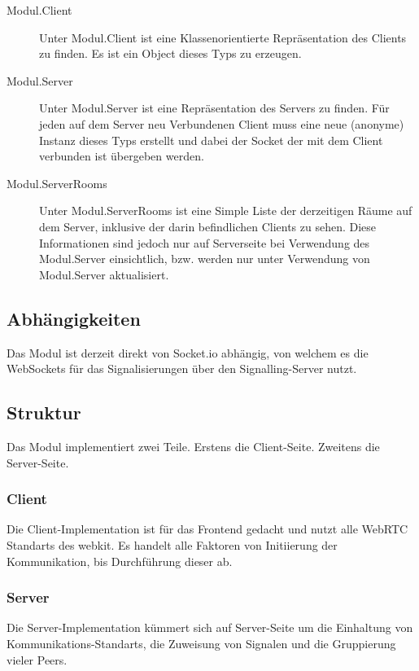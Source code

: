 \begin{description}
\item[Modul.Client]
Unter Modul.Client ist eine Klassenorientierte Repräsentation des Clients zu finden. Es ist ein Object dieses Typs zu erzeugen.

\item[Modul.Server]
Unter Modul.Server ist eine Repräsentation des Servers zu finden. Für jeden auf dem Server neu Verbundenen Client muss eine neue (anonyme) Instanz dieses Typs erstellt und dabei der Socket der mit dem Client verbunden ist übergeben werden.

\item[Modul.ServerRooms]
Unter Modul.ServerRooms ist eine Simple Liste der derzeitigen Räume auf dem Server, inklusive der darin befindlichen Clients zu sehen. Diese Informationen sind jedoch nur auf Serverseite bei Verwendung des Modul.Server einsichtlich, bzw. werden nur unter Verwendung von Modul.Server aktualisiert.
\end{description}

\subsection{Abhängigkeiten}
Das Modul ist derzeit direkt von Socket.io abhängig, von welchem es die WebSockets für das Signalisierungen über den Signalling-Server nutzt.

\subsection{Struktur}
Das Modul implementiert zwei Teile. Erstens die Client-Seite. Zweitens die Server-Seite.

\subsubsection{Client}
Die Client-Implementation ist für das Frontend gedacht und nutzt alle WebRTC Standarts des webkit. Es handelt alle Faktoren von Initiierung der Kommunikation, bis Durchführung dieser ab.

\subsubsection{Server}
Die Server-Implementation kümmert sich auf Server-Seite um die Einhaltung von Kommunikations-Standarts, die Zuweisung von Signalen und die Gruppierung vieler Peers.